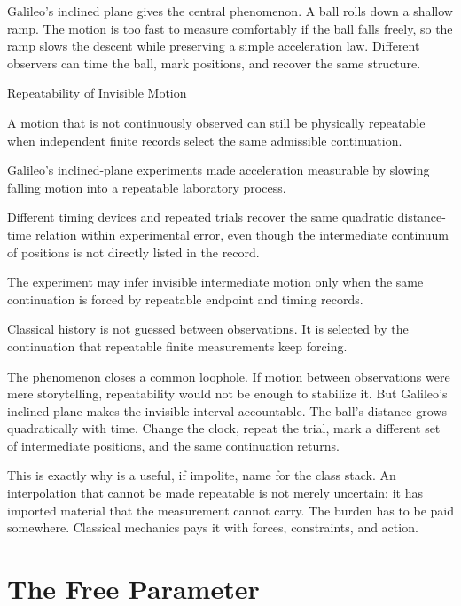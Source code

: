 Galileo's inclined plane gives the central phenomenon. A ball rolls down a
shallow ramp. The motion is too fast to measure comfortably if the ball falls
freely, so the ramp slows the descent while preserving a simple acceleration
law. Different observers can time the ball, mark positions, and recover the
same structure.

\begin{phenom}{Repeatability of Invisible Motion}
\label{ph:repeatability-of-invisible-motion}

\PhStatement A motion that is not continuously observed can still be physically
repeatable when independent finite records select the same admissible
continuation.

\PhOrigin Galileo's inclined-plane experiments made acceleration measurable by
slowing falling motion into a repeatable laboratory process.

\PhObservation Different timing devices and repeated trials recover the same
quadratic distance-time relation within experimental error, even though the
intermediate continuum of positions is not directly listed in the record.

\PhConstraint The experiment may infer invisible intermediate motion only when
the same continuation is forced by repeatable endpoint and timing records.

\PhConsequence Classical history is not guessed between observations. It is
selected by the continuation that repeatable finite measurements keep forcing.

\end{phenom}

The phenomenon closes a common loophole. If motion between observations were
mere storytelling, repeatability would not be enough to stabilize it. But
Galileo's inclined plane makes the invisible interval accountable. The ball's
distance grows quadratically with time. Change the clock, repeat the trial,
mark a different set of intermediate positions, and the same continuation
returns.

This is exactly why  is a useful, if impolite, name for the
class stack. An interpolation that cannot be made repeatable is not merely
uncertain; it has imported material that the measurement cannot carry. The
burden has to be paid somewhere. Classical mechanics pays it with forces,
constraints, and action.

\section{The Free Parameter}
\label{se:the-free-parameter}

